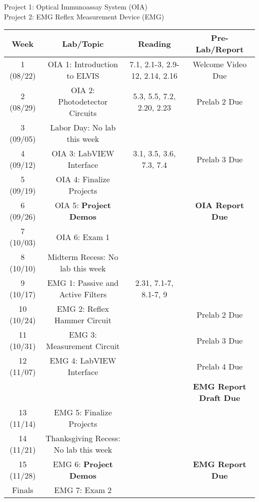 \documentclass{article}
\begin{document}
{\color{red} Project 1: Optical Immunoassay System (OIA)}\\

{\color{blue} Project 2: EMG Reflex Measurement Device (EMG)}\\

\begin{table}[h!]
	\centering
\begin{tabular}[h!]{cccc}
\toprule
	Week & Lab/Topic & Reading & Pre-Lab/Report\\
	\midrule
	1 (08/22) & {\color{red} OIA 1: Introduction to ELVIS} & 7.1, 2.1-3, 2.9-12, 2.14, 2.16 & {\color{red} Welcome Video Due}\\
	2 (08/29) & {\color{red} OIA 2: Photodetector Circuits} & 5.3, 5.5, 7.2, 2.20, 2.23 & {\color{red} Prelab 2 Due}\\
	\midrule
	3 (09/05) & Labor Day: No lab this week & &\\
	\midrule
	4 (09/12) & {\color{red} OIA 3: LabVIEW Interface} & 3.1, 3.5, 3.6, 7.3, 7.4 & {\color{red} Prelab 3 Due}\\
	5 (09/19) & {\color{red} OIA 4: Finalize Projects} & &\\
	6 (09/26) & {\color{red} OIA 5: \textbf{Project Demos}} & & {\color{red} \textbf{OIA Report Due}}\\
	7 (10/03) & {\color{red} OIA 6: Exam 1} & &\\
	\midrule
	8 (10/10) & Midterm Recess: No lab this week & &\\
	\midrule
	9 (10/17) & {\color{blue} EMG 1: Passive and Active Filters} & 2.31, 7.1-7, 8.1-7, 9 & \\
	10 (10/24) & {\color{blue} EMG 2: Reflex Hammer Circuit} & & {\color{blue} Prelab 2 Due}\\
	11 (10/31) & {\color{blue} EMG 3: Measurement Circuit} & & {\color{blue} Prelab 3 Due}\\
	12 (11/07) & {\color{blue} EMG 4: LabVIEW Interface} & & {\color{blue} Prelab 4 Due}\\
	& & & {\color{blue} \textbf{EMG Report Draft Due}}\\
	13 (11/14) & {\color{blue} EMG 5: Finalize Projects} & & \\
	\midrule
	14 (11/21) & Thanksgiving Recess: No lab this week & & \\
	\midrule
	15 (11/28) & {\color{blue} EMG 6: \textbf{Project Demos}} & & {\color{blue} \textbf{EMG Report Due}}\\
	Finals & {\color{blue} EMG 7: Exam 2} & &\\
	\bottomrule
\end{tabular}
\end{table}
\end{document}

